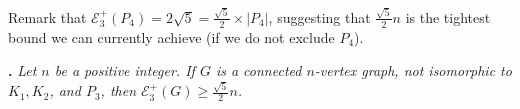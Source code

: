 \documentclass[a4paper,12pt]{article}
\theoremstyle{plain}
\newtheorem{corollary}[thm]{Corollary}
\begin{document}


Remark that $\mathcal{E}_3^{+}(P_4) = 2\sqrt{5} = \frac{\sqrt{5}}{2} \times |P_4|$, suggesting that $\frac{\sqrt{5}}{2} n$ is the tightest bound we can currently achieve (if we do not exclude $P_4$).


\medskip
\noindent
{\bf {}.} \emph{Let $n$ be a positive integer. If $G$ is a connected $n$-vertex graph, not isomorphic to $K_1,K_2$, and $P_3$, then $\mathcal{E}_3^{+}(G)  \geq \frac{\sqrt{5}}{2}n$.}
\end{document}

